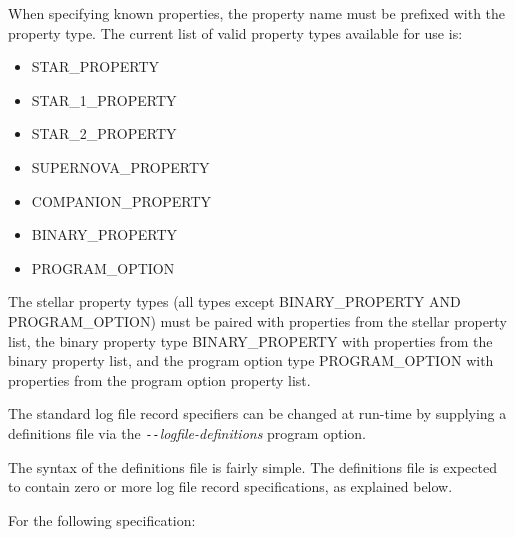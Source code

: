 When specifying known properties, the property name must be prefixed with the property type. The current list of valid property types available for use is:

\setlength{\parskip}{2pt}
\begin{itemize}
\itemsep0pt
\item  STAR\_PROPERTY
\item  STAR\_1\_PROPERTY
\item  STAR\_2\_PROPERTY
\item  SUPERNOVA\_PROPERTY
\item  COMPANION\_PROPERTY
\item  BINARY\_PROPERTY
\item  PROGRAM\_OPTION
\end{itemize}
\setlength{\parskip}{6pt}

The stellar property types (all types except BINARY\_PROPERTY AND PROGRAM\_OPTION) must be paired with properties from the stellar property list, the binary property type BINARY\_PROPERTY with properties from the binary property list, and the program option type PROGRAM\_OPTION with properties from the program option property list.

\newpage
{}\label{sec:StandardLogFileRecordSpecification}

The standard log file record specifiers can be changed at run-time by supplying a definitions file via the \textit{\texttt{-{}-}logfile-definitions} program option.

The syntax of the definitions file is fairly simple. The definitions file is expected to contain zero or more log file record specifications, as explained below.

\bigskip
For the following specification:

\setlength{\parskip}{3pt}
\tabto{3em}{::=}


\tabto{3em}{[$\ x\ $]}



\tabto{3em}{\textbar}

\tabto{3em}{\#}
\setlength{\parskip}{6pt}

